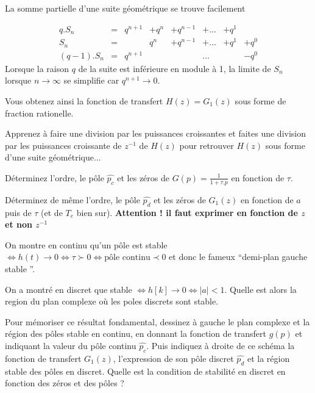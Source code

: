 \begin{remarque}
  La somme partielle d'une suite géométrique se trouve facilement

\begin{equation*}
  \begin{array}{cccccccc}
    q.S_n     &=&  q^{n+1}  &+ q^n  &+ q^{n-1} & +\dots & +q^1 &  \\
    S_n       &=&          & q^n   &+ q^{n-1} & +\dots & +q^1 & +q^0  \\
    (q-1).S_n &=&  q^{n+1}  &       &         & \dots  &     &- q^0
  \end{array}
\end{equation*}
Lorsque la raison $q$ de la suite est inférieure en module à 1, la
limite de $S_n$ lorsque $n\to \infty$ se simplifie car $q^{n+1}\to 0$.
\end{remarque}


Vous obtenez ainsi la fonction de transfert $H(z)=G_1(z)$ sous forme de fraction rationelle. 
\begin{remarque}
  Apprenez à faire une division par les puissances croissantes et
  faites une division par les puissances croissante de $z^{-1}$ de
  $H(z)$ pour retrouver $H(z)$ sous forme d'une suite géométrique...


\end{remarque}




Déterminez l'ordre, le pôle $\widehat{p_c}$ et les zéros de
$G(p)=\frac{1}{1+\tau.p}$ en fonction de $\tau$. 


Déterminez de même l'ordre, le pôle $\widehat{p_d}$ et les zéros de $G_1(z)$
en fonction de $a$ puis de $\tau$ (et de $T_e$ bien
sur). \textbf{Attention ! il faut exprimer en fonction de $z$ et non
  $z^{-1}$}

On montre en continu qu'un pôle est stable $\iff h(t) \to 0 \iff \tau\succ 0 \iff \text{pôle continu} \prec 0$ et donc le fameux ``demi-plan gauche stable ''.

On a montré en discret que stable $\iff h[k] \to 0 \iff |a|<1$. Quelle est alors la region du plan complexe où les poles discrets sont stable. 

Pour mémoriser ce résultat fondamental, dessinez à gauche le plan
complexe et la région des pôles stable en continu, en donnant la
fonction de transfert $g(p)$ et indiquant la valeur du pôle continu
$\widehat{p_c}$.  Puis indiquez à droite de ce schéma la fonction de transfert
$G_1(z)$, l'expression de son pôle discret $\widehat{p_d}$ et la région stable
des pôles en discret.  Quelle est la condition de stabilité en discret
en fonction des zéros et des pôles ?

